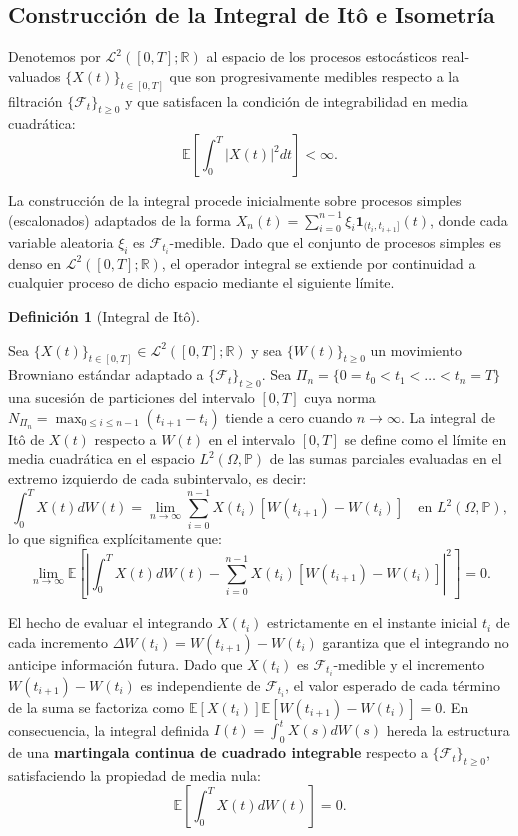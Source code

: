 \documentclass[
  spanish,
  us-letterpaper,
]{scrreprt}
\numberwithin{equation}{section}
\theoremstyle{plain}
\theoremstyle{plain}
\theoremstyle{plain}
\theoremstyle{definition}
\newtheorem{definition}{Definición}[chapter]
\theoremstyle{remark}
\begin{document}
\subsection{Construcción de la Integral de Itô e
Isometría}\label{construcciuxf3n-de-la-integral-de-ituxf4-e-isometruxeda}

Denotemos por \(\mathcal{L}^2([0, T]; \mathbb{R})\) al espacio de los
procesos estocásticos real-valuados \(\{X(t)\}_{t \in [0, T]}\) que son
progresivamente medibles respecto a la filtración
\(\{\mathcal{F}_t\}_{t \ge 0}\) y que satisfacen la condición de
integrabilidad en media cuadrática: \[
\mathbb{E}\left[\int_0^T \vert X(t) \vert^2 dt\right] < \infty.
\]

La construcción de la integral procede inicialmente sobre procesos
simples (escalonados) adaptados de la forma
\(\displaystyle X_n(t) = \sum_{i=0}^{n-1} \xi_i \mathbf{1}_{(t_i, t_{i+1}]}(t)\),
donde cada variable aleatoria \(\xi_i\) es
\(\mathcal{F}_{t_i}\)-medible. Dado que el conjunto de procesos simples
es denso en \(\mathcal{L}^2([0, T]; \mathbb{R})\), el operador integral
se extiende por continuidad a cualquier proceso de dicho espacio
mediante el siguiente límite.

\begin{definition}[Integral de
Itô]\protect\hypertarget{def-integral-ito}{}\label{def-integral-ito}

Sea \(\{X(t)\}_{t \in [0, T]} \in \mathcal{L}^2([0, T]; \mathbb{R})\) y
sea \(\{W(t)\}_{t \ge 0}\) un movimiento Browniano estándar adaptado a
\(\{\mathcal{F}_t\}_{t \ge 0}\). Sea
\(\Pi_n = \{0 = t_0 < t_1 < \dots < t_n = T\}\) una sucesión de
particiones del intervalo \([0, T]\) cuya norma
\(\displaystyle N_{\Pi_n} = \max_{0 \le i \le n-1} (t_{i+1} - t_i)\)
tiende a cero cuando \(n \to \infty\). La integral de Itô de \(X(t)\)
respecto a \(W(t)\) en el intervalo \([0, T]\) se define como el límite
en media cuadrática en el espacio \(L^2(\Omega, \mathbb{P})\) de las
sumas parciales evaluadas en el extremo izquierdo de cada subintervalo,
es decir: \[
\int_0^T X(t) dW(t) = \lim_{n \to \infty} \sum_{i=0}^{n-1} X(t_i) \left[ W(t_{i+1}) - W(t_i) \right] \quad \text{en } L^2(\Omega, \mathbb{P}),
\] lo que significa explícitamente que: \[
\lim_{n \to \infty} \mathbb{E}\left[ \left\vert \int_0^T X(t) dW(t) - \sum_{i=0}^{n-1} X(t_i) \left[ W(t_{i+1}) - W(t_i) \right] \right\vert^2 \right] = 0.
\]

\end{definition}

El hecho de evaluar el integrando \(X(t_i)\) estrictamente en el
instante inicial \(t_i\) de cada incremento
\(\Delta W(t_i) = W(t_{i+1}) - W(t_i)\) garantiza que el integrando no
anticipe información futura. Dado que \(X(t_i)\) es
\(\mathcal{F}_{t_i}\)-medible y el incremento \(W(t_{i+1}) - W(t_i)\) es
independiente de \(\mathcal{F}_{t_i}\), el valor esperado de cada
término de la suma se factoriza como
\(\mathbb{E}[X(t_i)]\mathbb{E}[W(t_{i+1}) - W(t_i)] = 0\). En
consecuencia, la integral definida
\(I(t) = \displaystyle \int_0^t X(s) dW(s)\) hereda la estructura de una
\textbf{martingala continua de cuadrado integrable} respecto a
\(\{\mathcal{F}_t\}_{t \ge 0}\), satisfaciendo la propiedad de media
nula: \[
\mathbb{E}\left[ \int_0^T X(t) dW(t) \right] = 0.
\]
\end{document}
